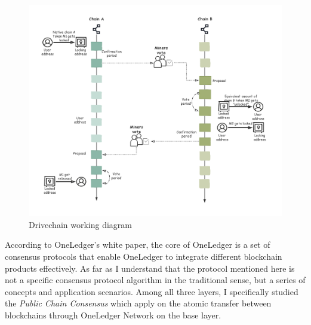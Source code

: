         \begin{figure}[H]
        \includegraphics[width=1\textwidth]{./figures/drive.png}
        \centering
        \caption{Drivechain  working diagram}%
        \centering
        \label{fig:drive}
        \end{figure}
\noindent According to OneLedger's white paper, the core of OneLedger is a set of consensus protocols that enable OneLedger to integrate different blockchain products effectively. As far as I understand that the protocol mentioned here is not a specific consensus protocol algorithm in the traditional sense, but a series of concepts and application scenarios. Among all three layers, I specifically studied the \textit{Public Chain Consensus} which apply on the atomic transfer between blockchains through OneLedger Network on the base layer.
